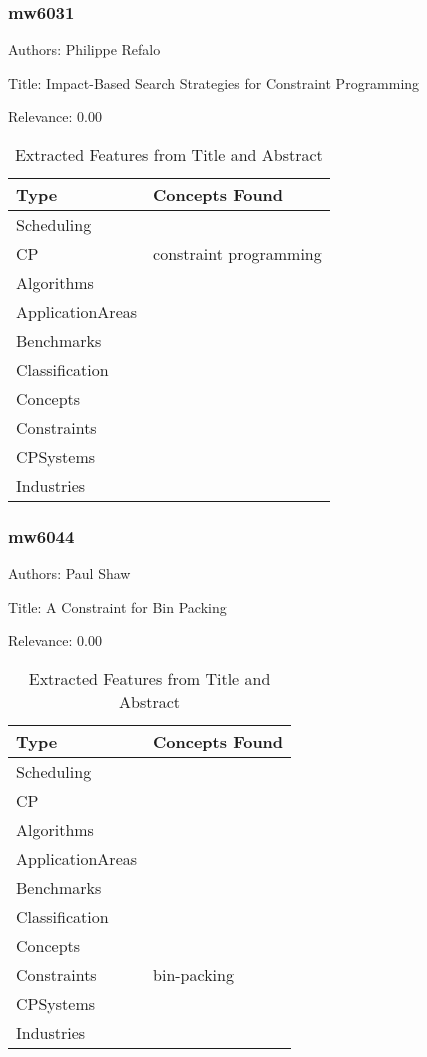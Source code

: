 \subsubsection{mw6031}
\label{mw:mw6031}

Authors: Philippe Refalo

Title: Impact-Based Search Strategies for Constraint Programming

Relevance:  0.00

{\scriptsize
\begin{longtable}{p{2cm}p{20cm}}
\caption{Extracted Features from Title and Abstract}\\ \toprule
Type & Concepts Found\\ \midrule
\endhead
\bottomrule
\endfoot
Scheduling & \\ 
CP & constraint programming\\ 
Algorithms & \\ 
ApplicationAreas & \\ 
Benchmarks & \\ 
Classification & \\ 
Concepts & \\ 
Constraints & \\ 
CPSystems & \\ 
Industries & \\ 
\end{longtable}
}



\subsubsection{mw6044}
\label{mw:mw6044}

Authors: Paul Shaw

Title: A Constraint for Bin Packing

Relevance:  0.00

{\scriptsize
\begin{longtable}{p{2cm}p{20cm}}
\caption{Extracted Features from Title and Abstract}\\ \toprule
Type & Concepts Found\\ \midrule
\endhead
\bottomrule
\endfoot
Scheduling & \\ 
CP & \\ 
Algorithms & \\ 
ApplicationAreas & \\ 
Benchmarks & \\ 
Classification & \\ 
Concepts & \\ 
Constraints & bin-packing\\ 
CPSystems & \\ 
Industries & \\ 
\end{longtable}
}



